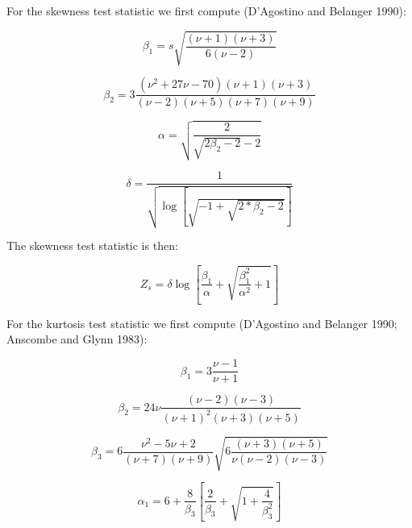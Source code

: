 \documentclass[
  a4paper,
]{article}
\begin{document}
For the skewness test statistic we first compute (D'Agostino and
Belanger 1990):

\begin{equation}
\beta_1 = s \sqrt{ \frac{\left(\nu + 1\right) \left(\nu + 3\right)} {6 \left(\nu - 2\right)} }
\end{equation}

\begin{equation}
\beta_2 = 3 \frac{\left(\nu^2 + 27\nu - 70\right) \left(\nu + 1\right) \left(\nu + 3\right)} {\left(\nu - 2\right) \left(\nu + 5\right) \left(\nu + 7\right) \left(\nu + 9\right)}
\end{equation}

\begin{equation}
\alpha = \sqrt{\frac{2} {\sqrt{2 \beta_2 - 2} - 2}}
\end{equation}

\begin{equation}
\delta = \frac{1}{\sqrt{\log \left[\sqrt{-1 + \sqrt{2 * \beta_2 - 2}} \right]}}
\end{equation}

The skewness test statistic is then:

\begin{equation}
Z_s = \delta \log\left[\frac{\beta_1}{\alpha} + \sqrt{\frac{\beta_1^2}{\alpha^2} + 1} \right]
\end{equation}

For the kurtosis test statistic we first compute (D'Agostino and
Belanger 1990; Anscombe and Glynn 1983):

\begin{equation}
\beta_1 = 3 \frac{\nu - 1}{\nu + 1}
\end{equation}

\begin{equation}
\beta_2 = 24 \nu \frac{\left(\nu - 2\right)\left(\nu - 3\right)}{\left(\nu + 1\right)^2 \left(\nu + 3\right) \left(\nu + 5\right)}
\end{equation}

\begin{equation}
\beta_3 = 6 \frac{\nu^2 - 5 \nu + 2}{\left(\nu + 7\right) \left(\nu + 9\right)} \sqrt{6 \frac{\left(\nu + 3\right) \left(\nu + 5\right)}{\nu \left(\nu - 2\right) \left(\nu - 3 \right)}}
\end{equation}

\begin{equation}
\alpha_1 = 6 + \frac{8}{\beta_3} \left[\frac{2}{\beta_3} + \sqrt{1 + \frac{4}{\beta_3^2}} \right]
\end{equation}
\end{document}
